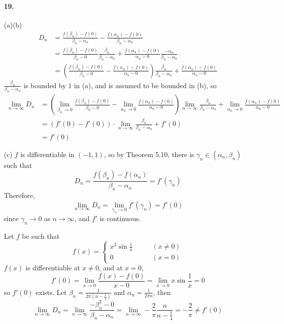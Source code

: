 \documentclass[a4paper]{article}
\begin{document}
\paragraph{19.}
(a)(b)
\begin{equation*}
    \begin{split}
        D_n & =\frac{f(\beta_n)-f(0)}{\beta_n-\alpha_n}-\frac{f(\alpha_n)-f(0)}{\beta_n-\alpha_n}\\
        & =\frac{f(\beta_n)-f(0)}{\beta_n-0}\frac{\beta_n}{\beta_n-\alpha_n}+\frac{f(\alpha_n)-f(0)}{\alpha_n-0}\frac{-\alpha_n}{\beta_n-\alpha_n}\\
        & =\left(\frac{f(\beta_n)-f(0)}{\beta_n-0}-\frac{f(\alpha_n)-f(0)}{\alpha_n-0} \right)\frac{\beta_n}{\beta_n-\alpha_n}+\frac{f(\alpha_n)-f(0)}{\alpha_n-0}
    \end{split}
\end{equation*}
$\frac{\beta_n}{\beta_n-\alpha_n}$ is bounded by $1$ in (a), and is assumed to be bounded in (b), so
\begin{equation*}
    \begin{split}
        \lim_{n\to\infty}D_n & =\left(\lim_{\beta_n\to0}\frac{f(\beta_n)-f(0)}{\beta_n-0}-\lim_{\alpha_n\to0}\frac{f(\alpha_n)-f(0)}{\alpha_n-0} \right)\lim_{n\to\infty}\frac{\beta_n}{\beta_n-\alpha_n}+\lim_{\alpha_n\to0}\frac{f(\alpha_n)-f(0)}{\alpha_n-0}\\
        & = \left(f'(0)-f'(0) \right)\cdot\lim_{n\to\infty}\frac{\beta_n}{\beta_n-\alpha_n}+f'(0)\\
        & =f'(0)
    \end{split}
\end{equation*}

(c)
$f$ is differentiable in $(-1,1)$, so by Theorem 5.10, there is $\gamma_n\in(\alpha_n,\beta_n)$ such that
\[
D_n=\frac{f(\beta_n)-f(\alpha_n)}{\beta_n-\alpha_n}=f'(\gamma_n)
\]
Therefore,
\[
\lim_{n\to\infty}D_n=\lim_{\gamma_n\to0}f'(\gamma_n)=f'(0)
\]
since $\gamma_n\to0$ as $n\to\infty$, and $f'$ is continuous.
\medskip

Let $f$ be such that
\[
f(x)=\begin{cases}
x^2\sin\frac{1}{x}\qquad & (x\neq0)\\
0\qquad & (x=0)
\end{cases}
\]
$f(x)$ is differentiable at $x\neq0$, and at $x=0$,
\[
f'(0)=\lim_{x\to0}\frac{f(x)-f(0)}{x-0}=\lim_{x\to0}x\sin\frac{1}{x}=0
\]
so $f'(0)$ exists. Let $\beta_n=\frac{1}{2\pi(n-\frac{1}{4})}$ and $\alpha_n=\frac{1}{2\pi n}$, then
\[
\lim_{n\to\infty}D_n=\lim_{n\to\infty}\frac{-\beta_n^2-0}{\beta_n-\alpha_n}=\lim_{n\to\infty}-\frac{2}{\pi}\frac{n}{n-\frac{1}{4}}=-\frac{2}{\pi}\neq f'(0)
\]
\end{document}
